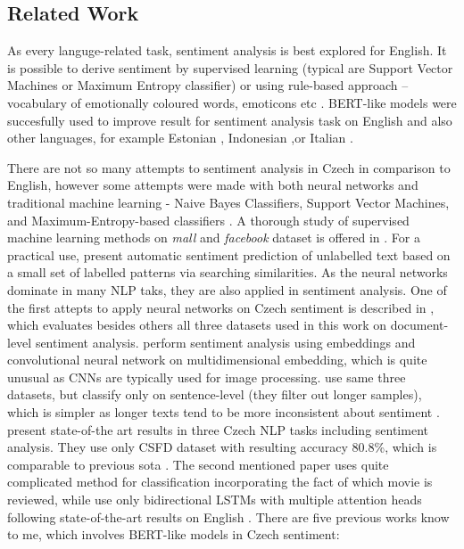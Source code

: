 \subsection{Related Work}
As every languge-related task, sentiment analysis is best explored for English. It is possible to derive sentiment by supervised learning (typical are Support Vector Machines or Maximum Entropy classifier) or using rule-based approach -- vocabulary of emotionally coloured words, emoticons etc \citep{Cano2019, Veselovska}. BERT-like models were succesfully used to improve result for sentiment analysis task on English \citep{Devlin2019} and also other languages, for example Estonian \citep{Kittask2020}, Indonesian \citep{putra} ,or Italian \citep{pota2021effective}.
\par
There are not so many attempts to sentiment analysis in Czech in comparison to English, however some attempts were made with both neural networks and traditional machine learning - Naive Bayes Classifiers, Support Vector Machines, and Maximum-Entropy-based classifiers \citep{Veselovska}.  A thorough study of supervised machine learning methods on \textit{mall} and \textit{facebook} dataset is offered in \citet{Cano2019}. For a practical use, \citet{Zizka} present automatic sentiment prediction of unlabelled text based on a small set of labelled patterns via searching similarities. As the neural networks dominate in many NLP taks, they are also applied in sentiment analysis. One of the first attepts to apply neural networks on Czech sentiment is described in \citet{Lenc}, which evaluates besides others all three datasets used in this work on document-level sentiment analysis. \citet{kysely} perform sentiment analysis using embeddings and convolutional neural network on multidimensional embedding, which is quite unusual as CNNs are typically used for image processing. \citet{kysely} use same three datasets, but classify only on sentence-level (they filter out longer samples), which is simpler as longer texts tend to be more inconsistent about sentiment \citep{Veselovska}. \citet{Libovicky} present state-of-the art results in three Czech NLP tasks including sentiment analysis. They use only CSFD dataset with resulting accuracy 80.8\%, which is comparable to previous \acrshort{sota} \citep{Brychcin2013}. The second mentioned paper uses quite complicated method for classification incorporating the fact of which movie is reviewed, while \citet{Libovicky} use only bidirectional LSTMs with multiple attention heads following state-of-the-art results on English \citep{Lin2017}. There are five previous works know to me, which involves BERT-like models in Czech sentiment: 
